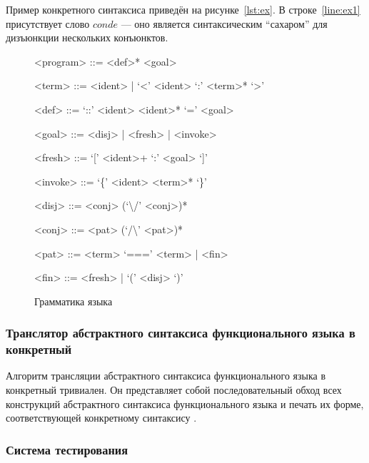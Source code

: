 Пример конкретного синтаксиса приведён на рисунке~\ref{lst:ex}.
В строке~\ref{line:ex1} присутствует слово $conde$ --- оно является синтаксическим ``сахаром'' для дизъюнкции нескольких конъюнктов.

\begin{figure}[h!]
  \begin{center}
    \begin{boxedminipage}{0.78\linewidth}
    <program> ::= <def>* <goal>

    <term> ::= <ident> | `<' <ident> `:' <term>* `>'

    <def> ::= `::' <ident> <ident>* `=' <goal>

    <goal> ::= <disj> | <fresh> | <invoke>

    <fresh> ::= `[' <ident>+ `:' <goal> `]'

    <invoke> ::= `\{' <ident> <term>* `\}'

    <disj> ::= <conj> (`\textbackslash /' <conj>)*

    <conj> ::= <pat> (`/\textbackslash' <pat>)*

    <pat> ::= <term> `===' <term> | <fin>

    <fin> ::= <fresh> | `(' <disj> `)'
    \end{boxedminipage}
  \end{center}
  \caption{Грамматика языка \miniKanren{}}
  \label{mk:grammar}
\end{figure}


\subsubsection{Транслятор абстрактного синтаксиса функционального языка в конкретный}

Алгоритм трансляции абстрактного синтаксиса функционального языка в конкретный тривиален.
Он представляет собой последовательный обход всех конструкций абстрактного синтаксиса функционального языка и печать их форме, соответствующей конкретному синтаксису \haskell{}.


\subsubsection{Система тестирования}

